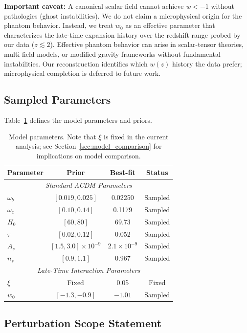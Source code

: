 \documentclass[twocolumn,showpacs,preprintnumbers,amsmath,amssymb,prd]{revtex4-2}
\begin{document}
\textbf{Important caveat:} A canonical scalar field cannot achieve $w < -1$ without pathologies (ghost instabilities). We do not claim a microphysical origin for the phantom behavior. Instead, we treat $w_0$ as an effective parameter that characterizes the late-time expansion history over the redshift range probed by our data ($z \lesssim 2$). Effective phantom behavior can arise in scalar-tensor theories, multi-field models, or modified gravity frameworks without fundamental instabilities. Our reconstruction identifies which $w(z)$ history the data prefer; microphysical completion is deferred to future work.

\subsection{Sampled Parameters}

Table~\ref{tab:params} defines the model parameters and priors.

\begin{table}[h]
\centering
\begin{tabular}{lccc}
\toprule
Parameter & Prior & Best-fit & Status \\
\midrule
\multicolumn{4}{c}{\textit{Standard $\Lambda$CDM Parameters}} \\
\midrule
$\omega_b$ & $[0.019, 0.025]$ & 0.02250 & Sampled \\
$\omega_c$ & $[0.10, 0.14]$ & 0.1179 & Sampled \\
$H_0$ & $[60, 80]$ & 69.73 & Sampled \\
$\tau$ & $[0.02, 0.12]$ & 0.052 & Sampled \\
$A_s$ & $[1.5, 3.0] \times 10^{-9}$ & $2.1 \times 10^{-9}$ & Sampled \\
$n_s$ & $[0.9, 1.1]$ & 0.967 & Sampled \\
\midrule
\multicolumn{4}{c}{\textit{Late-Time Interaction Parameters}} \\
\midrule
$\xi$ & Fixed & 0.05 & Fixed \\
$w_0$ & $[-1.3, -0.9]$ & $-1.01$ & Sampled \\
\bottomrule
\end{tabular}
\caption{Model parameters. Note that $\xi$ is fixed in the current analysis; see Section~\ref{sec:model_comparison} for implications on model comparison.}
\label{tab:params}
\end{table}

\subsection{Perturbation Scope Statement}
\end{document}
